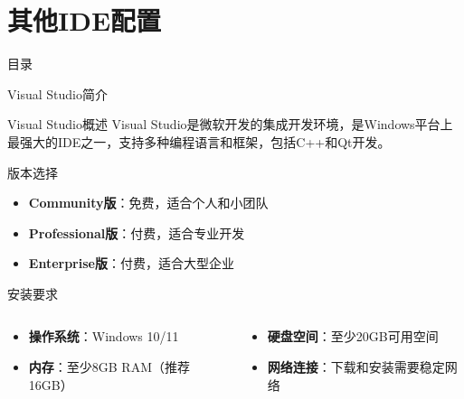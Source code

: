 \documentclass[UTF8,aspectratio=169]{beamer}
\begin{document}
\section{其他IDE配置}
\begin{frame}{目录}
    \begin{multicols}{2}
        \tableofcontents[currentsection]
    \end{multicols}
\end{frame}

\begin{frame}{Visual Studio简介}
    \begin{ytublock}{Visual Studio概述}
        Visual Studio是微软开发的集成开发环境，是Windows平台上最强大的IDE之一，支持多种编程语言和框架，包括C++和Qt开发。
    \end{ytublock}

    \begin{ytublock}{版本选择}
        \begin{itemize}
            \item \textbf{Community版}：免费，适合个人和小团队
            \item \textbf{Professional版}：付费，适合专业开发
            \item \textbf{Enterprise版}：付费，适合大型企业
        \end{itemize}
    \end{ytublock}

    \begin{ytublock}{安装要求}
        \begin{columns}
            \begin{column}{0.48\textwidth}
                \begin{itemize}
                    \item \textbf{操作系统}：Windows 10/11
                    \item \textbf{内存}：至少8GB RAM（推荐16GB）
                \end{itemize}
            \end{column}
            \hspace{0.02\textwidth}
            \begin{column}{0.48\textwidth}
                \begin{itemize}
                    \item \textbf{硬盘空间}：至少20GB可用空间
                    \item \textbf{网络连接}：下载和安装需要稳定网络
                \end{itemize}
            \end{column}
        \end{columns}
    \end{ytublock}
\end{frame}
\end{document}
